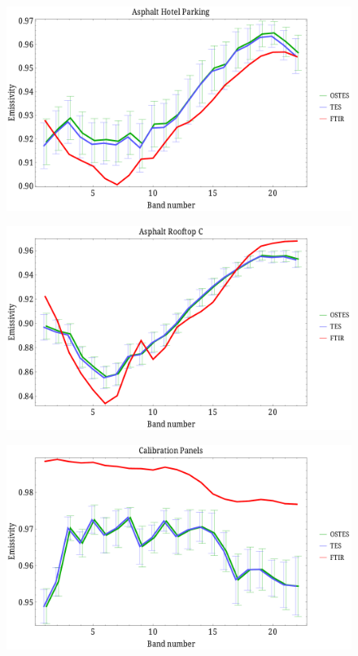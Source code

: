 \documentclass[xcolor=dvipsnames]{beamer}
\begin{document}
\begin{frame}[plain]{}
\begin{figure}[htb]
	\centering
	\includegraphics[scale=0.35]{AsphaltHotelParking_scaled.pdf}
\end{figure}
\end{frame}

\begin{frame}[plain]{}
\begin{figure}[htb]
	\centering
	\includegraphics[scale=0.35]{AsphaltRooftopC_scaled.pdf}
\end{figure}
\end{frame}

\begin{frame}[plain]{}
\begin{figure}[htb]
	\centering
	\includegraphics[scale=0.35]{CalibrationPanels_scaled.pdf}
\end{figure}
\end{frame}
\end{document}
